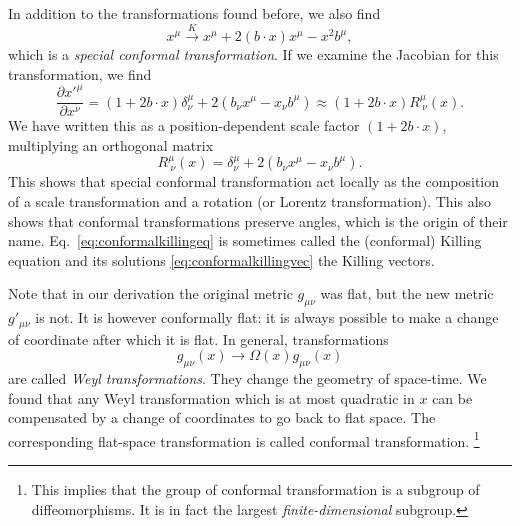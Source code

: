 \documentclass[a4paper,12pt]{article}
\numberwithin{equation}{section}
\begin{document}
In addition to the transformations found before, we also find
\begin{equation}
	x^\mu \xrightarrow{K} x^\mu +  2 (b \cdot x) x^\mu - x^2 b^\mu,
\end{equation}
which is a \emph{special conformal transformation}.
If we examine the Jacobian for this transformation, we find
\begin{equation}
	\frac{\partial x'^\mu}{\partial x^\nu}
	= \left(1 + 2 b \cdot x \right) \delta^\mu_\nu
	+ 2 \left( b_\nu x^\mu - x_\nu b^\mu \right)
	\approx \left(1 + 2 b \cdot x \right)
	R^\mu_{~\nu}(x).
\end{equation}
We have written this as a position-dependent scale factor $(1 + 2 b \cdot x)$, multiplying an orthogonal matrix
\begin{equation}
	R^\mu_{~\nu}(x) = \delta^\mu_\nu
	+ 2 \left( b_\nu x^\mu - x_\nu b^\mu \right).
\end{equation}
This shows that special conformal transformation act locally as the composition of a scale transformation and a rotation (or Lorentz transformation). This also shows that conformal transformations preserve angles, which is the origin of their name.
Eq.~\eqref{eq:conformalkillingeq} is sometimes called the (conformal) Killing equation and its solutions \eqref{eq:conformalkillingvec} the Killing vectors.



Note that in our derivation the original metric $g_{\mu\nu}$ was flat, but the new metric $g'_{\mu\nu}$ is not. It is however conformally flat: it is always possible to make a change of coordinate after which it is flat. In general, transformations
\begin{equation}
	g_{\mu\nu}(x) \to \Omega(x) g_{\mu\nu}(x)
\end{equation}
are called \emph{Weyl transformations}. They change the geometry of space-time. We found that any Weyl transformation which is at most quadratic in $x$ can be compensated by a change of coordinates to go back to flat space. The corresponding flat-space transformation is called conformal transformation.%
%
\footnote{This implies that the group of conformal transformation is a subgroup of diffeomorphisms. It is in fact the largest \emph{finite-dimensional} subgroup.}%
\end{document}
